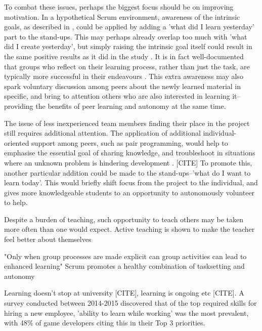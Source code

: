 \documentclass{scrartcl}
\begin{document}
To combat these issues, perhaps the biggest focus should be on improving motivation. In a hypothetical Scrum environment, awareness of the intrinsic goals, as described in \cite{motivation}, could be applied by adding a 'what did I learn yesterday' part to the stand-ups. This may perhaps already overlap too much with 'what did I create yesterday', but simply raising the intrinsic goal itself could result in the same positive results as it did in the study \cite{motivation}. It is in fact well-documented that groups who reflect on their learning process, rather than just the task, are typically more successful in their endeavours \cite{effectivegroups}. This extra awareness may also spark voluntary discussion among peers about the newly learned material in specific, and bring to attention others who are also interested in learning it--providing the benefits of peer learning and autonomy at the same time.

The issue of less inexperienced team members finding their place in the project still requires additional attention. The application of additional individual-oriented support among peers, such as pair programming, would help to emphasise the essential goal of sharing knowledge, and troubleshoot in situations where an unknown problem is hindering development \cite{motivation}. [CITE] To promote this, another particular addition could be made to the stand-ups--'what do I want to learn today'. This would briefly shift focus from the project to the individual, and gives more knowledgeable students to an opportunity to autonomously volunteer to help.

Despite a burden of teaching, such opportunity to teach others may be taken more often than one would expect. Active teaching is shown to make the teacher feel better about themselves \cite{activepassive}

"Only when group processes are made explicit can group activities can lead to enhanced learning" \cite{group2005} Scrum promotes a healthy combination of tasksetting and autonomy

Learning doesn't stop at university [CITE], learning is ongoing etc [CITE]. A survey conducted between 2014-2015 discovered that of the top required skills for hiring a new employee, 'ability to learn while working' \cite{devstudy} was the most prevalent, with 48\% of game developers citing this in their Top 3 priorities.
\end{document}
